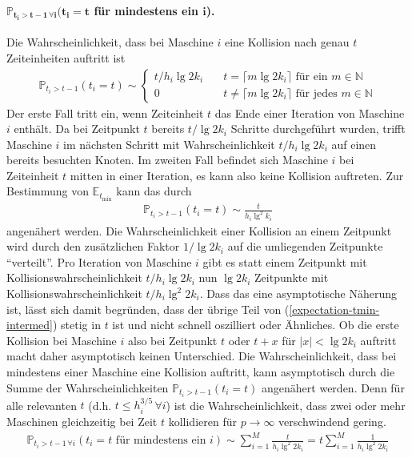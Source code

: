 \documentclass[a4paper, 10pt, ngerman]{article}
\newcommand{\E}{\mathbb{E}}
\newcommand{\N}{\mathbb{N}}
\renewcommand{\P}{\mathbb{P}}
\begin{document}
\paragraph{$\boldsymbol{\pmb{\P}_{t_i > t - 1 \, \forall i}(t_i = t}$  für mindestens ein $\boldsymbol{i}$).} Die Wahrscheinlichkeit, dass bei Maschine $i$ eine Kollision nach genau $t$ Zeiteinheiten auftritt ist
    \begin{align*}
        \P_{t_i > t - 1}(t_i = t) \sim
        \begin{cases}
            t / h_i \lg 2k_i & \quad
            t = \lceil m \lg 2k_i \rceil \text{ für ein } m \in \N \\
            0                & \quad
            t \ne \lceil m \lg 2k_i \rceil \text{ für jedes } m \in \N
        \end{cases}
    \end{align*}
    Der erste Fall tritt ein, wenn Zeiteinheit $t$ das Ende einer Iteration von Maschine $i$ enthält. Da bei Zeitpunkt $t$ bereits $t/\lg 2k_i$ Schritte durchgeführt wurden, trifft Maschine $i$ im nächsten Schritt mit Wahrscheinlichkeit $t/h_i \lg 2k_i$ auf einen bereits besuchten Knoten. Im zweiten Fall befindet sich Maschine $i$ bei Zeiteinheit $t$ mitten in einer Iteration, es kann also keine Kollision auftreten. Zur Bestimmung von $\E_{t_{\min}}$ kann das durch
    \begin{align*}
        \P_{t_i > t - 1}(t_i = t) \sim \frac {t} {h_i \lg^2 k_i}
    \end{align*}
    angenähert werden. Die Wahrscheinlichkeit einer Kollision an einem Zeitpunkt wird durch den zusätzlichen Faktor $1/\lg 2k_i$ auf die umliegenden Zeitpunkte "`verteilt"'. Pro Iteration von Maschine $i$ gibt es statt einem Zeitpunkt mit Kollisionswahrscheinlichkeit $t/h_i \lg 2k_i$ nun $\lg 2k_i$ Zeitpunkte mit Kollisionswahrscheinlichkeit $t/h_i \lg^2 2k_i$. Dass das eine asymptotische Näherung ist, lässt sich damit begründen, dass der übrige Teil von (\ref{expectation-tmin-intermed}) stetig in $t$ ist und nicht schnell oszilliert oder Ähnliches. Ob die erste Kollision bei Maschine $i$ also bei Zeitpunkt $t$ oder $t + x$ für $|x| < \lg 2k_i$ auftritt macht daher asymptotisch keinen Unterschied. Die Wahrscheinlichkeit, dass bei mindestens einer Maschine eine Kollision auftritt, kann asymptotisch durch die Summe der Wahrscheinlichkeiten $\P_{t_i > t - 1}(t_i = t)$ angenähert werden. Denn für alle relevanten $t$ (d.h. $t \le h_i^{3/5} \, \forall i$) ist die Wahrscheinlichkeit, dass zwei oder mehr Maschinen gleichzeitig bei Zeit $t$ kollidieren für $p \to \infty$ verschwindend gering.
    \begin{align}
        \P_{t_i > t - 1 \, \forall i}(t_i = t \text{ für mindestens ein } i)
        \sim \sum_{i = 1}^M \frac t {h_i \lg^2 2k_i}
        = t \sum_{i = 1}^M \frac 1 {h_i \lg^2 2k_i}
        \label{prob-at-least-one-coll}
    \end{align}
\end{document}
